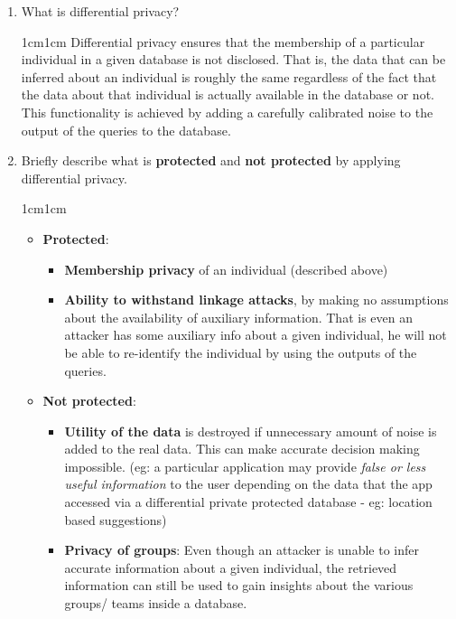 \documentclass[11pt,letterpaper]{article}
\newenvironment{answer}{\em \color{blue} \begin{adjustwidth}{1cm}{1cm}}{\end{adjustwidth}}
\begin{document}
	\begin{enumerate}
		
		\item What is differential privacy?
		
		\begin{answer}
			Differential privacy ensures that the membership of a particular individual in a given database is not disclosed. That is, the data that can be inferred about an individual is roughly the same regardless of the fact that the data about that individual is actually available in the database or not. This functionality is achieved by adding a carefully calibrated noise to the output of the queries to the database.
		\end{answer}
		
		\item Briefly describe what is \textbf{protected} and \textbf{not protected} by applying differential privacy.
		
		\begin{answer}
			\begin{itemize}
				\item \textbf{\sc Protected}:
				\begin{itemize}
					\item \textbf{Membership privacy} of an individual (described above)
					
					\item \textbf{Ability to withstand linkage attacks}, by making no assumptions about the availability of auxiliary information. That is even an attacker has some auxiliary info about a given individual, he will not be able to re-identify the individual by using the outputs of the queries.					
				\end{itemize} 
				
				\item \textbf{\sc Not protected}:
				\begin{itemize}
					\item \textbf{Utility of the data} is destroyed if unnecessary amount of noise is added to the real data. This can make accurate decision making impossible. (eg: a particular application may provide \textit{false or less useful information} to the user depending on the data that the app accessed via a differential private protected database - eg: location based suggestions)
					
					\item \textbf{Privacy of groups}: Even though an attacker is unable to infer accurate information about a given individual, the retrieved information can still be used to gain insights about the various groups/ teams inside a database.
				\end{itemize}
				

\end{itemize}
\end{answer}
\end{enumerate}
\end{document}
